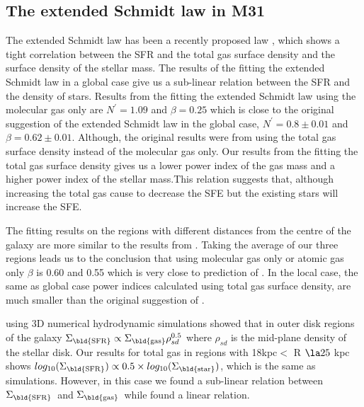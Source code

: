 \documentclass[useAMS,usenatbib]{mn2e}
\newcommand \sigmagas    {$\Sigma_{\rm \bld {gas }}$\ }
\newcommand \eqsigmagas    {\Sigma_{\rm \bld {gas }}}
\newcommand \sigmasfr     {$\Sigma_{\rm \bld {SFR }}$\ }
\newcommand \eqsigmasfr     {\Sigma_{\rm \bld {SFR }}}
\newcommand \eqsigmastar    {\Sigma_{\rm \bld {star }}}
\newcommand \eqnprime {N^\prime}
\begin{document}
\subsection{The extended Schmidt law in M31}
\label{sec:es_res}
The extended Schmidt law has been a recently proposed law \citep{Shi11}, which shows a tight correlation between the SFR and the total gas surface density and the surface density of the stellar mass. The results of the fitting the extended Schmidt law in a global case give us a sub-linear relation between the SFR and the density of stars. Results from the fitting the extended Schmidt law using the molecular gas only are $\eqnprime = 1.09$ and $\beta = 0.25$ which is close to the original suggestion of the extended Schmidt law in the global case, $\eqnprime = 0.8 \pm 0.01$ and $\beta = 0.62\pm0.01$. Although, the original results were from using the total gas surface density instead of the molecular gas only. Our results from the fitting the total gas surface density gives us a lower power index of the gas mass and a higher power index of the stellar mass.This relation suggests that, although increasing the total gas cause to decrease the SFE but the existing stars will increase the SFE. 

 The fitting results on the regions with different distances from the centre of the galaxy are more similar to the results from \cite{Shi11}. Taking the average of our three regions leads us to the conclusion that using molecular gas only or atomic gas only $\beta$ is 0.60 and 0.55 which is very close to prediction of \cite{Shi11}. In the local case, the same as global case power indices calculated using total gas surface density, are much smaller than the original suggestion of \cite{Shi11}. 
 
 \cite{Kim13} using 3D numerical hydrodynamic simulations showed that in outer disk regions of the galaxy $\eqsigmasfr \propto \eqsigmagas \rho_{sd}^{0.5}$ where $\rho_{sd}$ is the mid-plane density of the stellar disk. Our results for total gas in regions with 18kpc$<$ R $\la 25$ kpc shows $log_{10}(\eqsigmasfr) \propto 0.5 \times log_{10}(\eqsigmastar)$, which is the same as simulations. However, in this case we found a sub-linear relation between \sigmasfr and \sigmagas while \cite{Kim13} found a linear relation. 



\end{document}

